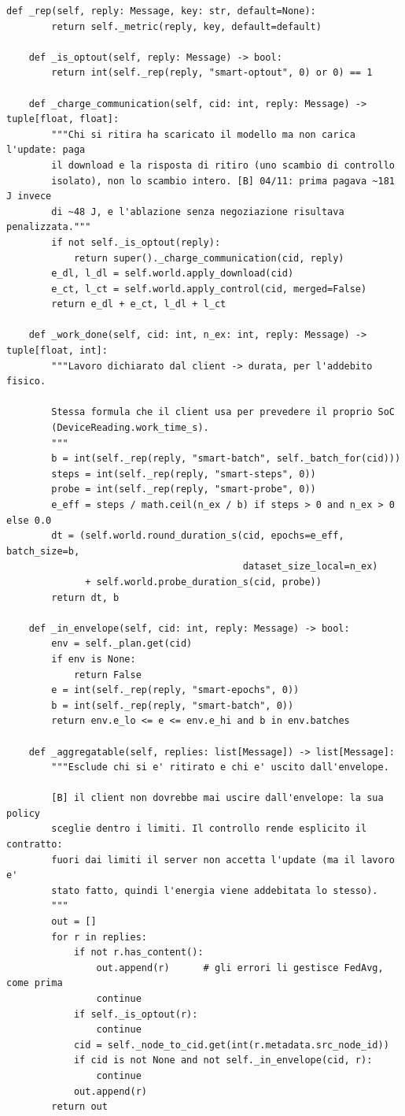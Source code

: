 \documentclass[11pt,a4paper]{article}
\begin{document}
\begin{lstlisting}[style=py,firstnumber=777,caption={\texttt{tesifl/strategies/sage\_smart.py}, lines 777--842}]
    def _rep(self, reply: Message, key: str, default=None):
        return self._metric(reply, key, default=default)

    def _is_optout(self, reply: Message) -> bool:
        return int(self._rep(reply, "smart-optout", 0) or 0) == 1

    def _charge_communication(self, cid: int, reply: Message) -> tuple[float, float]:
        """Chi si ritira ha scaricato il modello ma non carica l'update: paga
        il download e la risposta di ritiro (uno scambio di controllo
        isolato), non lo scambio intero. [B] 04/11: prima pagava ~181 J invece
        di ~48 J, e l'ablazione senza negoziazione risultava penalizzata."""
        if not self._is_optout(reply):
            return super()._charge_communication(cid, reply)
        e_dl, l_dl = self.world.apply_download(cid)
        e_ct, l_ct = self.world.apply_control(cid, merged=False)
        return e_dl + e_ct, l_dl + l_ct

    def _work_done(self, cid: int, n_ex: int, reply: Message) -> tuple[float, int]:
        """Lavoro dichiarato dal client -> durata, per l'addebito fisico.

        Stessa formula che il client usa per prevedere il proprio SoC
        (DeviceReading.work_time_s).
        """
        b = int(self._rep(reply, "smart-batch", self._batch_for(cid)))
        steps = int(self._rep(reply, "smart-steps", 0))
        probe = int(self._rep(reply, "smart-probe", 0))
        e_eff = steps / math.ceil(n_ex / b) if steps > 0 and n_ex > 0 else 0.0
        dt = (self.world.round_duration_s(cid, epochs=e_eff, batch_size=b,
                                          dataset_size_local=n_ex)
              + self.world.probe_duration_s(cid, probe))
        return dt, b

    def _in_envelope(self, cid: int, reply: Message) -> bool:
        env = self._plan.get(cid)
        if env is None:
            return False
        e = int(self._rep(reply, "smart-epochs", 0))
        b = int(self._rep(reply, "smart-batch", 0))
        return env.e_lo <= e <= env.e_hi and b in env.batches

    def _aggregatable(self, replies: list[Message]) -> list[Message]:
        """Esclude chi si e' ritirato e chi e' uscito dall'envelope.

        [B] il client non dovrebbe mai uscire dall'envelope: la sua policy
        sceglie dentro i limiti. Il controllo rende esplicito il contratto:
        fuori dai limiti il server non accetta l'update (ma il lavoro e'
        stato fatto, quindi l'energia viene addebitata lo stesso).
        """
        out = []
        for r in replies:
            if not r.has_content():
                out.append(r)      # gli errori li gestisce FedAvg, come prima
                continue
            if self._is_optout(r):
                continue
            cid = self._node_to_cid.get(int(r.metadata.src_node_id))
            if cid is not None and not self._in_envelope(cid, r):
                continue
            out.append(r)
        return out


\end{lstlisting}
\end{document}
